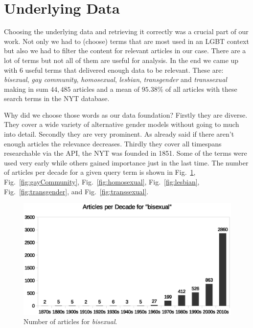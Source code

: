 \documentclass[10pt,a4paper,twocolumn]{scrartcl}
\begin{document}
\section{Underlying Data}

Choosing the underlying data and retrieving it correctly was a crucial part of our work. Not only we had to (choose) terms that are most used in an LGBT context but also we had to filter the content for relevant articles in our case. There are a lot of terms but not all of them are useful for analysis. In the end we came up with 6 useful terms that delivered enough data to be relevant. These are: \textit{bisexual}, \textit{gay community}, \textit{homosexual}, \textit{lesbian}, \textit{transgender} and \textit{transsexual} making in sum $44,485$ articles and a mean of $95.38\%$ of all articles with these search terms in the NYT database. 

Why did we choose those words as our data foundation? Firstly they are diverse. They cover a wide variety of alternative gender models without going to much into detail. Secondly they are very prominent. As already said if there aren't enough articles the relevance decreases. Thirdly they cover all timespans researchable via the API, the NYT was founded in 1851. Some of the terms were used very early while others gained importance just in the last time. The number of articles per decade for a given query term is shown in Fig.~\ref{fig:bisexual}, Fig.~\ref{fig:gayCommunity}, Fig.~\ref{fig:homosexual}, Fig.~\ref{fig:lesbian}, Fig.~\ref{fig:transgender}, and Fig.~\ref{fig:transsexual}.


\begin{figure}
\includegraphics[width=\columnwidth]{figures/bisexual_decade}
\caption{Number of articles for \textit{bisexual}.} \label{fig:bisexual}
\end{figure}
\end{document}

